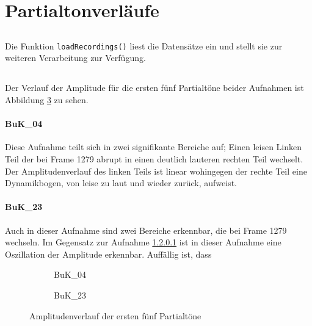 \section{Partialtonverläufe}
\label{sec:1}

\subsection{}
Die Funktion \texttt{loadRecordings()} liest die Datensätze ein und stellt sie zur weiteren Verarbeitung zur Verfügung.

\subsection{}
Der Verlauf der Amplitude für die ersten fünf Partialtöne beider Aufnahmen ist Abbildung \ref{fig:ampl} zu sehen.

\paragraph{BuK\_04}
\label{par:04}
Diese Aufnahme teilt sich in zwei signifikante Bereiche auf;
Einen leisen Linken Teil der bei Frame 1279 abrupt in einen deutlich lauteren rechten Teil wechselt.
Der Amplitudenverlauf des linken Teils ist linear wohingegen der rechte Teil eine Dynamikbogen, von leise zu laut und wieder zurück, aufweist.

\paragraph{BuK\_23}
Auch in dieser Aufnahme sind zwei Bereiche erkennbar, die bei Frame 1279 wechseln.
Im Gegensatz zur Aufnahme \ref{par:04} ist in dieser Aufnahme eine Oszillation der Amplitude erkennbar.
Auffällig ist, dass 

\begin{figure}[tbh]
    \centering
    \begin{subfigure}{.5\textwidth}
        \centering
        \caption{BuK\_04}
        \scalebox{0.5}{}
        \label{fig:sub1}
    \end{subfigure}%
    \begin{subfigure}{.5\textwidth}
        \centering
        \caption{BuK\_23}
        \scalebox{0.5}{}
        \label{fig:sub2}
    \end{subfigure}
    \caption{Amplitudenverlauf der ersten fünf Partialtöne}
    \label{fig:ampl}
\end{figure}

